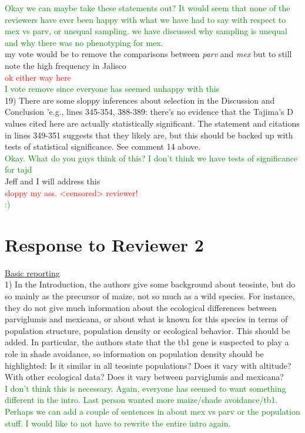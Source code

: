 \documentclass[11pt]{article}
\newcommand{\jri}[1]{\noindent \textcolor{red}{{#1}} \\}
\newcommand{\lev}[1]{\noindent \textcolor{green}{{#1}} \\}
\newcommand{\mbh}[1]{\noindent \textcolor{Dandelion}{{#1}}\\}
\begin{document}
\lev{Okay we can maybe take these statements out? It would seem that none of the reviewers have ever been happy with what we have had to say with respect to mex vs parv, or unequal sampling. we have discussed why sampling is unequal and why there was no phenotyping for mex.}

\mbh{my vote would be to remove the comparisons between \emph{parv} and \emph{mex} but to still note the high frequency in Jalisco}
\jri{ok either way here}
\lev{I vote remove since everyone has seemed unhappy with this}

19) There are some sloppy inferences about selection in the Discussion and Conclusion 'e.g., lines 345-354, 388-389: there's no evidence that the Tajima's D values cited here are actually statistically significant. The statement and citations in lines 349-351 suggests that they likely are, but this should be backed up with tests of statistical significance. See comment 14 above.\\

\lev{Okay. What do you guys think of this? I don't think we have tests of significance for tajd}

\mbh{Jeff and I will address this}
\jri{sloppy my ass. <censored> reviewer!}
\lev{ :) }


\section*{Response to Reviewer 2} 

\underline{Basic reporting}\\

1) In the Introduction, the authors give some background about teosinte, but do so mainly as the precursor of maize, not so much as a wild species. For instance, they do not give much information about the ecological differences between parviglumis and mexicana, or about what is known for this species in terms of population structure, population density or ecological behavior. This should be added. In particular, the authors state that the tb1 gene is suspected to play a role in shade avoidance, so information on population density should be highlighted: Is it similar in all teosinte populations? Does it vary with altitude? With other ecological data? Does it vary between parviglumis and mexicana?\\

\lev{I don't think this is necessary. Again, everyone has seemed to want something different in the intro. Last person wanted more maize/shade avoidance/tb1. Perhaps we can add a couple of sentences in about mex vs parv or the population stuff. I would like to not have to rewrite the entire intro again.}
\end{document}
